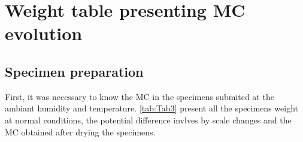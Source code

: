 
\chapter{Weight table presenting MC evolution} %

\label{Appendix2} %

\section{Specimen preparation}

First, it was necessary to know the MC in the specimens submited at the ambiant humidity and temperature. \ref{tab:Tab3} present all the specimens weight at normal conditions, the potential difference invlves by scale changes and the MC obtained after drying the specimens.
\newpage
